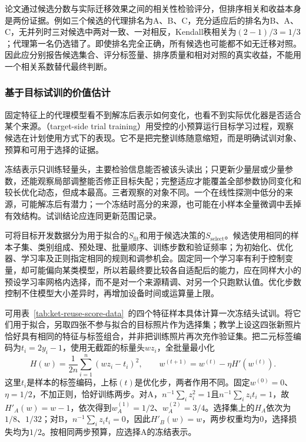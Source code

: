 论文通过候选分数与实际迁移效果之间的相关性检验评分，但排序相关和收益本身是两份证据。例如三个候选的代理排名为A、B、C，充分适应后的排名为B、A、C，无并列时三对候选中两对一致、一对相反，Kendall秩相关为$(2-1)/3=1/3$；代理第一名仍选错了。即使排名完全正确，所有候选也可能都不如无迁移对照。因此应分别报告候选集合、评分标签量、排序质量和相对对照的真实收益，不能用一个相关系数替代最终判断。

\subsubsection{基于目标试训的价值估计}
\label{sec:ket-reuse-target-trials}

固定特征上的代理模型看不到解冻后表示如何变化，也看不到实际优化器是否适合某个来源。（target-side trial training）用受控的小预算运行目标学习过程，观察候选在计划使用方式下的表现。它不是把完整训练随意缩短，而是明确试训对象、预算和可用于选择的证据。

冻结表示只训练轻量头，主要检验信息能否被该头读出；只更新少量层或少量参数，还能观察局部调整能否修正目标失配；完整适应才能覆盖全部参数协同变化和较长优化动态，但成本最高。三者观察的对象不同。一个在线性探测中低分的来源，可能解冻后有潜力；一个冻结时高分的来源，也可能在小样本全量微调中丢掉有效结构。试训结论应连同更新范围记录。

可将目标开发数据分为用于拟合的$S_{\mathrm{fit}}$和用于候选决策的$S_{\mathrm{select}}$。候选使用相同的样本子集、类别组成、预处理、批量顺序、训练步数和验证频率；为初始化、优化器、学习率及正则指定相同的规则和调参机会。固定同一个学习率有利于控制变量，却可能偏向某类模型，所以若最终要比较各自适配后的能力，应在同样大小的预设学习率网格内选择，而不是对一个来源精调、对另一个只跑默认值。优化步数控制不住模型大小差异时，再增加设备时间或运算量上限。

可用表~\ref{tab:ket-reuse-score-data}~的四个特征样本具体计算一次冻结头试训。将它们用于拟合，另取四张不参与拟合的目标照片作为选择集；教学上设这四张新照片恰好具有相同的特征与标签组合，并非把训练照片再次充作验证集。把二元标签编码为$t_i=2y_i-1$，使用无截距的标量头$wz_i$，全批量最小化
\begin{equation}
  H(w)=\frac{1}{2n}\sum_{i=1}^{n}(wz_i-t_i)^2,
  \qquad
  w^{(t+1)}=w^{(t)}-\eta H'(w^{(t)}).
  \label{eq:ket-reuse-trial-update}
\end{equation}
这里$t_i$是样本的标签编码，上标$(t)$是优化步，两者作用不同。固定$w^{(0)}=0$、$\eta=1/2$，不加正则，恰好训练两步。对A，$n^{-1}\sum_i z_i^2=1$且$n^{-1}\sum_i z_it_i=1$，故$H'_A(w)=w-1$，依次得到$w_A^{(1)}=1/2$、$w_A^{(2)}=3/4$。选择集上的$H_A$依次为$1/8$、$1/32$；对B，$n^{-1}\sum_i z_it_i=0$，因此$H'_B(w)=w$，两步权重均为0，选择损失均为$1/2$。按相同两步预算，应选择A的冻结表示。

